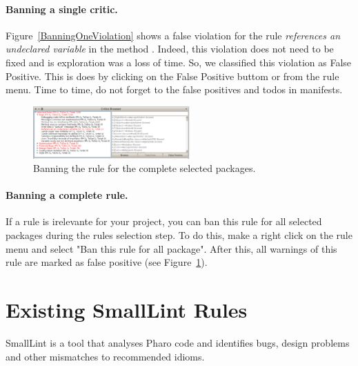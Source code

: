 \documentclass[a4paper,10pt,twoside]{book}
\begin{document}
\paragraph{Banning a single critic.}
Figure~\ref{BanningOneViolation} shows a false violation for the rule \emph{references an undeclared variable} in the method . Indeed,  this violation does not need to be fixed and is exploration was a loss of time. So, we classified this violation as False Positive. This is does by clicking on the False Positive buttom or from the rule menu. Time to time, do not forget to the false positives and todos in manifests.



\begin{figure}[h]
\centering
\includegraphics[width=6cm]{BanningTimeStampRules}
\caption{Banning the rule for the complete selected packages.\label{BanningTimeStampRules}}
\end{figure}


\paragraph{Banning a complete rule.}
If a rule is irelevante for your project, you can ban this rule for all selected packages during the rules selection step. To do this, make a right click on the rule menu and select "Ban this rule for all package". After this, all  warnings of this rule are marked as false positive (see Figure~\ref{BanningTimeStampRules}). 





\section{Existing SmallLint Rules}\label{existingRules}
SmallLint is a tool that analyses Pharo code and identifies bugs, design problems and other mismatches to recommended idioms. 

\end{document}
